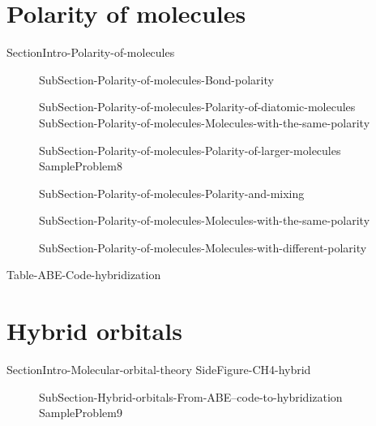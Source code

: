 \documentclass[main.tex]{subfiles}
\begin{document}
\section{Polarity of molecules}{SectionIntro-Polarity-of-molecules}
\sloppy \begin{description}
\item[] {SubSection-Polarity-of-molecules-Bond-polarity}
\item[] {SubSection-Polarity-of-molecules-Polarity-of-diatomic-molecules}
{SubSection-Polarity-of-molecules-Molecules-with-the-same-polarity}
\item[] {SubSection-Polarity-of-molecules-Polarity-of-larger-molecules}
{SampleProblem8}
\item[] {SubSection-Polarity-of-molecules-Polarity-and-mixing}
\item[] {SubSection-Polarity-of-molecules-Molecules-with-the-same-polarity}
\item[] {SubSection-Polarity-of-molecules-Molecules-with-different-polarity}
\end{description}
{Table-ABE-Code-hybridization}
\section{Hybrid orbitals}{SectionIntro-Molecular-orbital-theory}
{SideFigure-CH4-hybrid}	
\sloppy \begin{description}
\item[] {SubSection-Hybrid-orbitals-From-ABE--code-to-hybridization}
{SampleProblem9}
\end{description}
\end{document}
